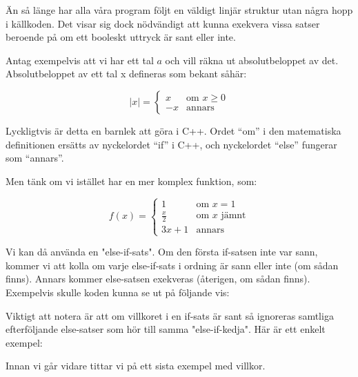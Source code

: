 Än så länge har alla våra program följt en väldigt linjär struktur utan några hopp i källkoden. Det visar sig dock nödvändigt att kunna exekvera vissa satser beroende på om ett booleskt uttryck är sant eller inte.

Antag exempelvis att vi har ett tal $a$ och vill räkna ut absolutbeloppet av det. Absolutbeloppet av ett tal x defineras som bekant såhär:

$$
|x| = 
\left\{
    \begin{array}{ll}
        x & \mbox{om } x \geq 0 \\
        -x & \mbox{annars}
    \end{array}
\right.
$$

Lyckligtvis är detta en barnlek att göra i C++. Ordet ``om'' i den matematiska definitionen ersätts av nyckelordet ``if'' i C++, och nyckelordet ``else'' fungerar som ``annars''.



Men tänk om vi istället har en mer komplex funktion, som:

$$
f(x) = 
\left\{
    \begin{array}{lll}
        1 & \mbox{om } x = 1\\
        \frac{x}{2} & \mbox{om } x \mbox{ jämnt}\\
        3x+1 & \mbox{annars}
    \end{array}
\right.
$$

Vi kan då använda en "else-if-sats". Om den första if-satsen inte var sann, kommer vi att kolla om varje else-if-sats i ordning är sann eller inte (om sådan finns). Annars kommer else-satsen exekveras (återigen, om sådan finns). Exempelvis skulle koden kunna se ut på följande vis:




Viktigt att notera är att om villkoret i en if-sats är sant så ignoreras samtliga efterföljande else-satser som hör till samma "else-if-kedja". Här är ett enkelt exempel:



Innan vi går vidare tittar vi på ett sista exempel med villkor.



